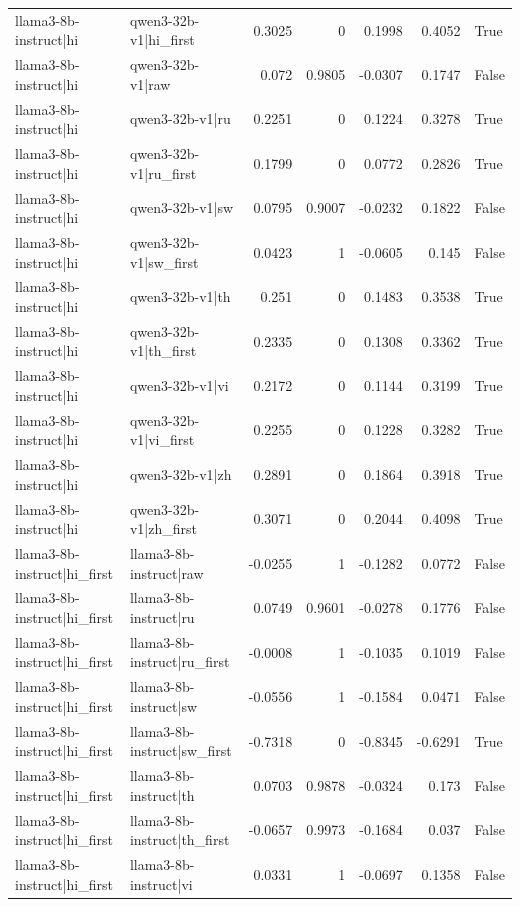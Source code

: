 \begin{table}
\begin{tabular}{l l r r r r l}
llama3-8b-instruct|hi & qwen3-32b-v1|hi_first & 0.3025 & 0 & 0.1998 & 0.4052 & True \\
llama3-8b-instruct|hi & qwen3-32b-v1|raw & 0.072 & 0.9805 & -0.0307 & 0.1747 & False \\
llama3-8b-instruct|hi & qwen3-32b-v1|ru & 0.2251 & 0 & 0.1224 & 0.3278 & True \\
llama3-8b-instruct|hi & qwen3-32b-v1|ru_first & 0.1799 & 0 & 0.0772 & 0.2826 & True \\
llama3-8b-instruct|hi & qwen3-32b-v1|sw & 0.0795 & 0.9007 & -0.0232 & 0.1822 & False \\
llama3-8b-instruct|hi & qwen3-32b-v1|sw_first & 0.0423 & 1 & -0.0605 & 0.145 & False \\
llama3-8b-instruct|hi & qwen3-32b-v1|th & 0.251 & 0 & 0.1483 & 0.3538 & True \\
llama3-8b-instruct|hi & qwen3-32b-v1|th_first & 0.2335 & 0 & 0.1308 & 0.3362 & True \\
llama3-8b-instruct|hi & qwen3-32b-v1|vi & 0.2172 & 0 & 0.1144 & 0.3199 & True \\
llama3-8b-instruct|hi & qwen3-32b-v1|vi_first & 0.2255 & 0 & 0.1228 & 0.3282 & True \\
llama3-8b-instruct|hi & qwen3-32b-v1|zh & 0.2891 & 0 & 0.1864 & 0.3918 & True \\
llama3-8b-instruct|hi & qwen3-32b-v1|zh_first & 0.3071 & 0 & 0.2044 & 0.4098 & True \\
llama3-8b-instruct|hi_first & llama3-8b-instruct|raw & -0.0255 & 1 & -0.1282 & 0.0772 & False \\
llama3-8b-instruct|hi_first & llama3-8b-instruct|ru & 0.0749 & 0.9601 & -0.0278 & 0.1776 & False \\
llama3-8b-instruct|hi_first & llama3-8b-instruct|ru_first & -0.0008 & 1 & -0.1035 & 0.1019 & False \\
llama3-8b-instruct|hi_first & llama3-8b-instruct|sw & -0.0556 & 1 & -0.1584 & 0.0471 & False \\
llama3-8b-instruct|hi_first & llama3-8b-instruct|sw_first & -0.7318 & 0 & -0.8345 & -0.6291 & True \\
llama3-8b-instruct|hi_first & llama3-8b-instruct|th & 0.0703 & 0.9878 & -0.0324 & 0.173 & False \\
llama3-8b-instruct|hi_first & llama3-8b-instruct|th_first & -0.0657 & 0.9973 & -0.1684 & 0.037 & False \\
llama3-8b-instruct|hi_first & llama3-8b-instruct|vi & 0.0331 & 1 & -0.0697 & 0.1358 & False \\

\end{tabular}
\end{table}
